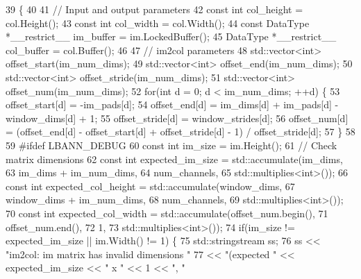 \begin{DoxyCode}
39                                         \{
40 
41   \textcolor{comment}{// Input and output parameters}
42   \textcolor{keyword}{const} \textcolor{keywordtype}{int} col\_height = col.Height();
43   \textcolor{keyword}{const} \textcolor{keywordtype}{int} col\_width = col.Width();
44   \textcolor{keyword}{const} DataType *\_\_restrict\_\_ im\_buffer = im.LockedBuffer();
45   DataType *\_\_restrict\_\_ col\_buffer = col.Buffer();
46 
47   \textcolor{comment}{// im2col parameters}
48   std::vector<int> offset\_start(im\_num\_dims);
49   std::vector<int> offset\_end(im\_num\_dims);
50   std::vector<int> offset\_stride(im\_num\_dims);
51   std::vector<int> offset\_num(im\_num\_dims);
52   \textcolor{keywordflow}{for}(\textcolor{keywordtype}{int} d = 0; d < im\_num\_dims; ++d) \{
53     offset\_start[d] = -im\_pads[d];
54     offset\_end[d] = im\_dims[d] + im\_pads[d] - window\_dims[d] + 1;
55     offset\_stride[d] = window\_strides[d];
56     offset\_num[d] = (offset\_end[d] - offset\_start[d] + offset\_stride[d] - 1) / offset\_stride[d];
57   \}
58 
59 \textcolor{preprocessor}{  #ifdef LBANN\_DEBUG}
60   \textcolor{keyword}{const} \textcolor{keywordtype}{int} im\_size = im.Height();
61   \textcolor{comment}{// Check matrix dimensions}
62   \textcolor{keyword}{const} \textcolor{keywordtype}{int} expected\_im\_size = std::accumulate(im\_dims,
63                                                im\_dims + im\_num\_dims,
64                                                num\_channels,
65                                                std::multiplies<int>());
66   \textcolor{keyword}{const} \textcolor{keywordtype}{int} expected\_col\_height = std::accumulate(window\_dims,
67                                                   window\_dims + im\_num\_dims,
68                                                   num\_channels,
69                                                   std::multiplies<int>());
70   \textcolor{keyword}{const} \textcolor{keywordtype}{int} expected\_col\_width = std::accumulate(offset\_num.begin(),
71                                                  offset\_num.end(),
72                                                  1,
73                                                  std::multiplies<int>());
74   \textcolor{keywordflow}{if}(im\_size != expected\_im\_size || im.Width() != 1) \{
75     std::stringstream ss;
76     ss << \textcolor{stringliteral}{"im2col: im matrix has invalid dimensions "}
77        << \textcolor{stringliteral}{"(expected "} << expected\_im\_size << \textcolor{stringliteral}{" x "} << 1 << \textcolor{stringliteral}{", "}

\end{DoxyCode}
